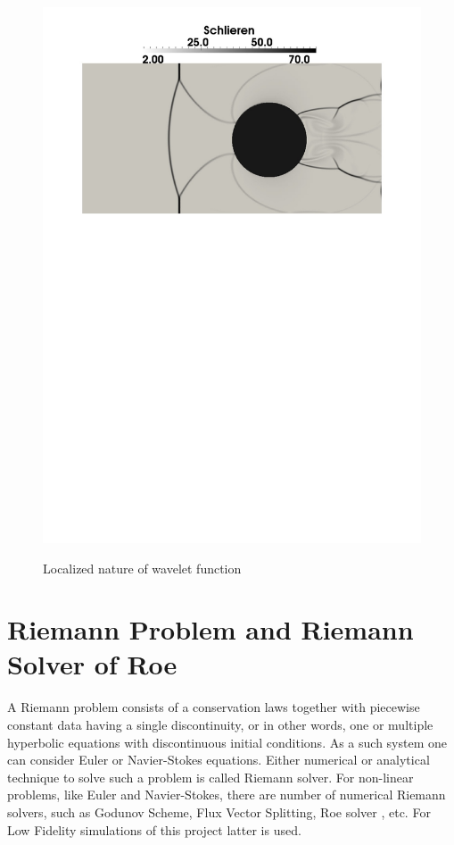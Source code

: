 \begin{figure}[h!]
\begin{minipage}{0.5\linewidth}
\includegraphics[scale=0.4]{fig/visc_sch.pdf}\\
\end{minipage}
\caption{Localized nature of wavelet function} \label{fig:visc}
\end{figure}

\section{Riemann Problem and Riemann Solver of Roe}
A Riemann problem consists of a conservation laws together with piecewise constant data having a single discontinuity, or in other words, one or multiple hyperbolic equations with discontinuous initial conditions. As a such system one can consider Euler or Navier-Stokes equations. Either numerical or analytical technique to solve such a problem is called Riemann solver. For non-linear problems, like Euler and Navier-Stokes, there are number of numerical Riemann solvers, such as Godunov Scheme, Flux Vector Splitting, Roe solver \cite{book:Toro}, etc. For Low Fidelity simulations of this project latter is used.

